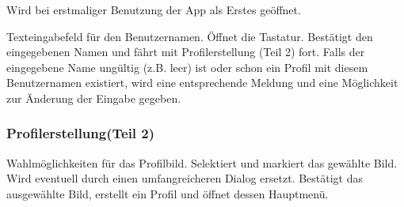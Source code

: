 Wird bei erstmaliger Benutzung der App als Erstes geöffnet.
\begin{requirements}
 Texteingabefeld für den Benutzernamen. Öffnet die Tastatur.
 Bestätigt den eingegebenen Namen und fährt mit Profilerstellung (Teil 2) fort. Falls der eingegebene Name ungültig (z.B. leer) ist oder schon ein Profil mit diesem Benutzernamen existiert, wird eine entsprechende Meldung und eine Möglichkeit zur Änderung der Eingabe gegeben.
\end{requirements}

\subsubsection{Profilerstellung(Teil 2)}

\begin{center}
\setlength\fboxsep{20pt}
\setlength\fboxrule{1pt}
\end{center}

\begin{requirements}
 Wahlmöglichkeiten für das Profilbild. Selektiert und markiert das gewählte Bild. Wird eventuell durch einen umfangreicheren Dialog ersetzt.
 Bestätigt das ausgewählte Bild, erstellt ein Profil und öffnet dessen Hauptmenü.
\end{requirements}

